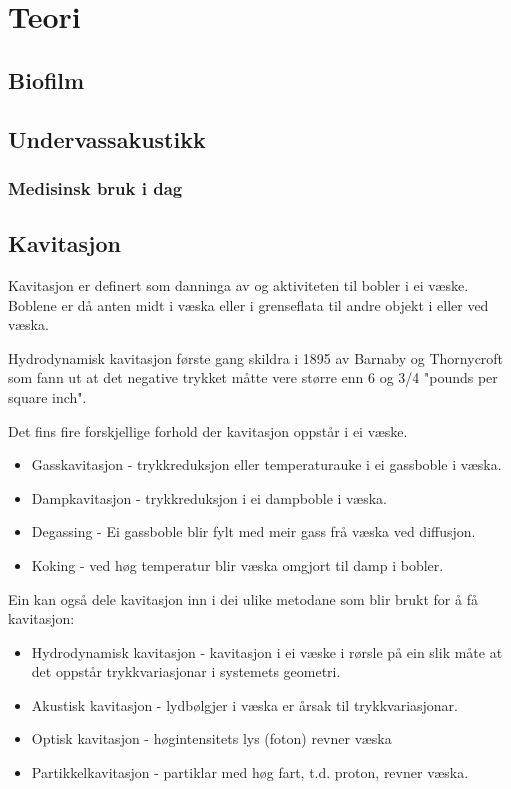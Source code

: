 \section{Teori}
\subsection{Biofilm}

\subsection{Undervassakustikk}
\subsubsection*{Medisinsk bruk i dag}
\subsection{Kavitasjon}

Kavitasjon er definert som danninga av og aktiviteten til bobler i ei væske. Boblene er då anten midt i væska eller i grenseflata til andre objekt i eller ved væska.

Hydrodynamisk kavitasjon første gang skildra i 1895 av Barnaby og Thornycroft som fann ut at det negative trykket måtte vere større enn 6 og 3/4 "pounds per square inch". \cite{Young:1999}

Det fins fire forskjellige forhold der kavitasjon oppstår i ei væske.

\begin{itemize}
\item Gasskavitasjon - trykkreduksjon eller temperaturauke i ei gassboble i væska.
\item Dampkavitasjon - trykkreduksjon i ei dampboble i væska.
\item Degassing - Ei gassboble blir fylt med meir gass frå væska ved diffusjon.
\item Koking - ved høg temperatur blir væska omgjort til damp i bobler.
\end{itemize}

Ein kan også dele kavitasjon inn i dei ulike metodane som blir brukt for å få kavitasjon:

\begin{itemize}
\item Hydrodynamisk kavitasjon - kavitasjon i ei væske i rørsle på ein slik måte at det oppstår trykkvariasjonar i systemets geometri.
\item Akustisk kavitasjon - lydbølgjer i væska er årsak til trykkvariasjonar.
\item Optisk kavitasjon - høgintensitets lys (foton) revner væska
\item Partikkelkavitasjon - partiklar med høg fart, t.d. proton, revner væska.
\end{itemize}

